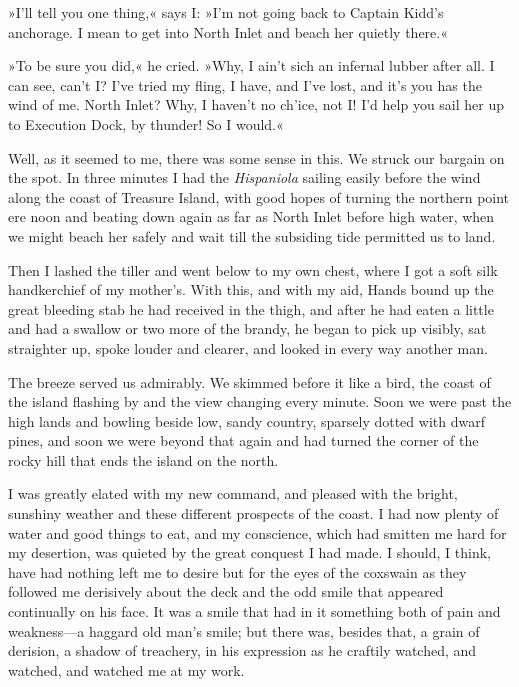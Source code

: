 »I'll tell you one thing,« says I: »I'm not going back to Captain Kidd's anchorage. I mean to get into North Inlet and beach her quietly there.«

»To be sure you did,« he cried. »Why, I ain't sich an infernal lubber after all. I can see, can't I? I've tried my fling, I have, and I've lost, and it's you has the wind of me. North Inlet? Why, I haven't no ch'ice, not I! I'd help you sail her up to Execution Dock, by thunder! So I would.«

Well, as it seemed to me, there was some sense in this. We struck our bargain on the spot. In three minutes I had the \textit{Hispaniola} sailing easily before the wind along the coast of Treasure Island, with good hopes of turning the northern point ere noon and beating down again as far as North Inlet before high water, when we might beach her safely and wait till the subsiding tide permitted us to land.

Then I lashed the tiller and went below to my own chest, where I got a soft silk handkerchief of my mother's. With this, and with my aid, Hands bound up the great bleeding stab he had received in the thigh, and after he had eaten a little and had a swallow or two more of the brandy, he began to pick up visibly, sat straighter up, spoke louder and clearer, and looked in every way another man.

The breeze served us admirably. We skimmed before it like a bird, the coast of the island flashing by and the view changing every minute. Soon we were past the high lands and bowling beside low, sandy country, sparsely dotted with dwarf pines, and soon we were beyond that again and had turned the corner of the rocky hill that ends the island on the north.

I was greatly elated with my new command, and pleased with the bright, sunshiny weather and these different prospects of the coast. I had now plenty of water and good things to eat, and my conscience, which had smitten me hard for my desertion, was quieted by the great conquest I had made. I should, I think, have had nothing left me to desire but for the eyes of the coxswain as they followed me derisively about the deck and the odd smile that appeared continually on his face. It was a smile that had in it something both of pain and weakness—a haggard old man's smile; but there was, besides that, a grain of derision, a shadow of treachery, in his expression as he craftily watched, and watched, and watched me at my work.